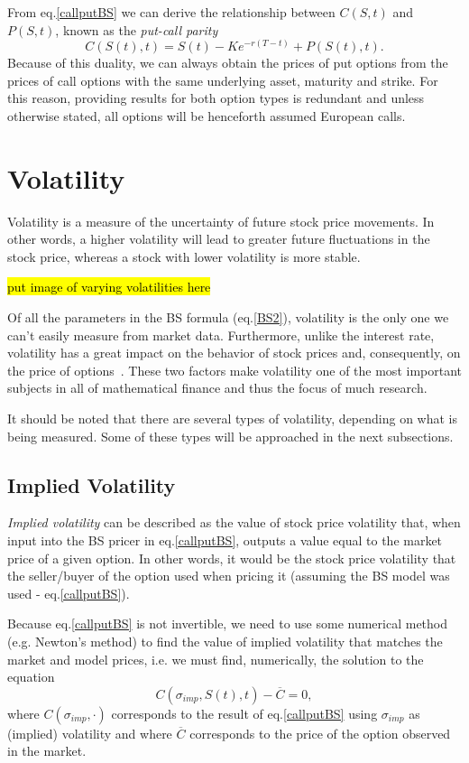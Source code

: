 From eq.\eqref{callputBS} we can derive the relationship between $C(S,t)$ and $P(S,t)$, known as the \emph{put-call parity}
\begin{equation}
C(S(t),t)=S(t)-Ke^{-r(T-t)}+P(S(t),t).
\end{equation}
\noindent Because of this duality, we can always obtain the prices of put options from the prices of call options with the same underlying asset, maturity and strike. For this reason, providing results for both option types is redundant and unless otherwise stated, all options will be henceforth assumed European calls.


\section{Volatility}
\label{section:volatility}
Volatility is a measure of the uncertainty of future stock price movements. In other words, a higher volatility will lead to greater future fluctuations in the stock price, whereas a stock with lower volatility is more stable.

\hl{put image of varying volatilities here}

Of all the parameters in the BS formula (eq.\eqref{BS2}), volatility is the only one we can't easily measure from market data.
Furthermore, unlike the interest rate, volatility has a great impact on the behavior of stock prices and, consequently, on the price of options~\cite{Wilmott3}.
These two factors make volatility one of the most important subjects in all of mathematical finance and thus the focus of much research.



It should be noted that there are several types of volatility, depending on what is being measured. Some of these types will be approached in the next subsections.

\subsection{Implied Volatility}
\label{section:impliedvolatility}
\emph{Implied volatility} can be described as the value of stock price volatility that, when input into the BS pricer in eq.\eqref{callputBS}, outputs a value equal to the market price of a given option.
In other words, it would be the stock price volatility that the seller/buyer of the option used when pricing it (assuming the BS model was used - eq.\eqref{callputBS}).

Because eq.\eqref{callputBS} is not invertible, we need to use some numerical method (e.g. Newton's method) to find the value of implied volatility that matches the market and model prices, i.e. we must find, numerically, the solution to the equation
\begin{equation}\label{impvolform}
C(\sigma_{imp},S(t),t)-\overline{C}=0,
\end{equation}
\noindent where $C(\sigma_{imp},\cdot)$ corresponds to the result of eq.\eqref{callputBS} using $\sigma_{imp}$ as (implied) volatility and where $\overline{C}$ corresponds to the price of the option observed in the market.

